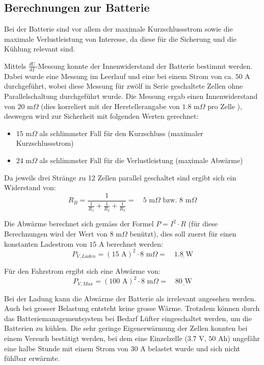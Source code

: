 \subsection{Berechnungen zur Batterie}
Bei der Batterie sind vor allem der maximale Kurzschlussstrom sowie die maximale Verlustleistung von Interesse, da diese für die Sicherung und die Kühlung relevant sind.

Mittels $\frac{dU}{dI}$-Messung konnte der Innenwiderstand der Batterie bestimmt werden. Dabei wurde eine Messung im Leerlauf und eine bei einem Strom von ca. $50$ A durchgeführt, wobei diese Messung für zwölf in Serie geschaltete Zellen ohne Parallelschaltung durchgeführt wurde. Die Messung ergab einen Innenwiderstand von $20$ m$\Omega$ (dies korreliert mit der Herstellerangabe von $1.8$ m$\Omega$ pro Zelle \cite{lev50}), deswegen wird zur Sicherheit mit folgenden Werten gerechnet:
\begin{itemize}
	\item $15$ m$\Omega$ als schlimmster Fall für den Kurzschluss (maximaler Kurzschlussstrom)
	\item $24$ m$\Omega$ als schlimmster Fall für die Verlustleistung (maximale Abwärme)
\end{itemize}

Da jeweils drei Stränge zu 12 Zellen parallel geschaltet sind ergibt sich ein Widerstand von:
\begin{equation*}
	R_B=\frac{1}{\frac{1}{R_1}+\frac{1}{R_2}+\frac{1}{R_3}}=\quad 5\text{ m}\Omega\text{ bzw. } 8\text{ m}\Omega
\end{equation*}

Die Abwärme berechnet sich gemäss der Formel $P=I^2\cdot R$ (für diese Berechnungen wird der Wert von $8$ m$\Omega$ benützt), dies soll zuerst für einen konstanten Ladestrom von $15$ A berechnet werden:
\begin{equation*}
	P_{V,Laden}=\left(15\text{ A}\right)^2\cdot8\text{ m}\Omega=\quad\underline{1.8\text{ W}}
\end{equation*}

Für den Fahrstrom ergibt sich eine Abwärme von:
\begin{equation*}
	P_{V,Max}=\left(100\text{ A}\right)^2\cdot8\text{ m}\Omega=\quad\underline{80\text{ W}}
\end{equation*}

Bei der Ladung kann die Abwärme der Batterie als irrelevant angesehen werden. Auch bei grosser Belastung entsteht keine grosse Wärme. Trotzdem können durch das Batteriemanagementsystem bei Bedarf Lüfter eingeschaltet werden, um die Batterien zu kühlen. Die sehr geringe Eigenerwärmung der Zellen konnten bei einem Versuch bestätigt werden, bei dem eine Einzelzelle ($3.7$ V, $50$ Ah) ungefähr eine halbe Stunde mit einem Strom von $30$ A belastet wurde und sich nicht fühlbar erwärmte.


